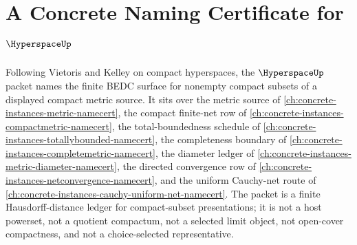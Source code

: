\chapter{A Concrete Naming Certificate for $\HyperspaceUp$}
\label{ch:concrete-instances-hyperspace-namecert}

Following Vietoris and Kelley on compact hyperspaces, the $\HyperspaceUp$ packet names the finite BEDC surface for nonempty compact subsets of a displayed compact metric source. It sits over the metric source of \autoref{ch:concrete-instances-metric-namecert}, the compact finite-net row of \autoref{ch:concrete-instances-compactmetric-namecert}, the total-boundedness schedule of \autoref{ch:concrete-instances-totallybounded-namecert}, the completeness boundary of \autoref{ch:concrete-instances-completemetric-namecert}, the diameter ledger of \autoref{ch:concrete-instances-metric-diameter-namecert}, the directed convergence row of \autoref{ch:concrete-instances-netconvergence-namecert}, and the uniform Cauchy-net route of \autoref{ch:concrete-instances-cauchy-uniform-net-namecert}. The packet is a finite Hausdorff-distance ledger for compact-subset presentations; it is not a host powerset, not a quotient compactum, not a selected limit object, not open-cover compactness, and not a choice-selected representative.

